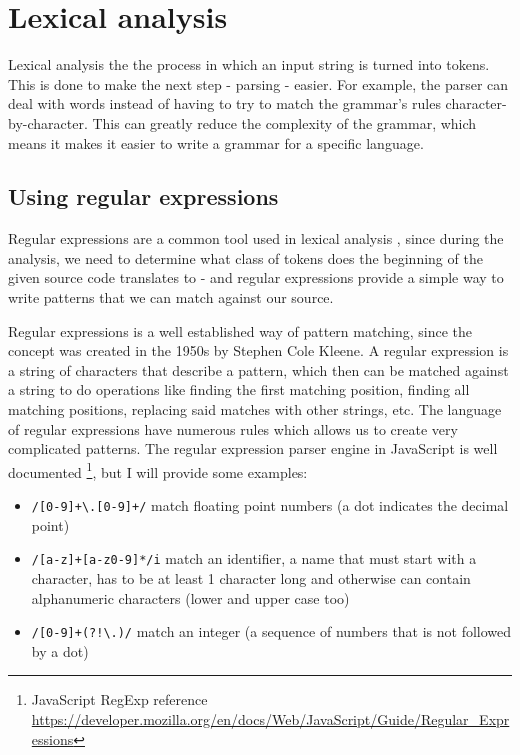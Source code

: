 \chapter{Lexical analysis}\label{sect:Lexing}
Lexical analysis the the process in which an input string is turned into tokens. This is done to make the next step - parsing - easier. For example, the parser can deal with words instead of having to try to match the grammar's rules character-by-character. This can greatly reduce the complexity of the grammar, which means it makes it easier to write a grammar for a specific language.
\section{Using regular expressions}
Regular expressions are a common tool used in lexical analysis \cite{Lex}, since during the analysis, we need to determine what class of tokens does the beginning of the given source code translates to - and regular expressions provide a simple way to write patterns that we can match against our source.

Regular expressions is a well established way of pattern matching, since the concept was created in the 1950s by Stephen Cole Kleene. A regular expression is a string of characters that describe a pattern, which then can be matched against a string to do operations like finding the first matching position, finding all matching positions, replacing said matches with other strings, etc. The language of regular expressions have numerous rules which allows us to create very complicated patterns. The regular expression parser engine in JavaScript is well documented \footnote{JavaScript RegExp reference \url{https://developer.mozilla.org/en/docs/Web/JavaScript/Guide/Regular_Expressions}}, but I will provide some examples:
\begin{itemize}
\item \texttt{/[0-9]+\textbackslash.[0-9]+/} match floating point numbers (a dot indicates the decimal point)
\item \texttt{/[a-z]+[a-z0-9]*/i} match an identifier, a name that must start with a character, has to be at least 1 character long and otherwise can contain alphanumeric characters (lower and upper case too)
\item \texttt{/[0-9]+(?!\textbackslash.)/} match an integer (a sequence of numbers that is not followed by a dot)
\end{itemize}

